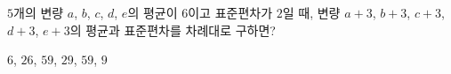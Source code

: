 $5$개의 변량 $a$, $b$, $c$, $d$, $e$의 평균이 $6$이고 표준편차가 $2$일 때, 변량 $a+3$, $b+3$, $c+3$, $d+3$, $e+3$의 평균과 표준편차를 차례대로 구하면?
\begin{choices32}{$6$, $2$}{$6$, $5$}{$9$, $2$}{$9$, $5$}{$9$, $9$}\end{choices32}
